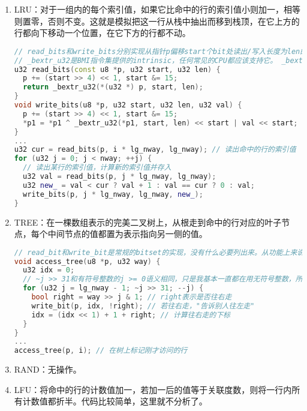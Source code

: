 \documentclass[12pt, UTF8]{article}
\begin{document}
\begin{enumerate}
  \item LRU：对于一组内的每个索引值，如果它比命中的行的索引值小则加一，相等则置零，否则不变。这就是模拟把这一行从栈中抽出而移到栈顶，在它上方的行都向下移动一个位置，在它下方的行都不动。
  
\begin{lstlisting}[language = C++, morekeywords = { u32 }, ndkeywords = { read_bits, write_bits }]
// read_bits和write_bits分别实现从指针p偏移start个bit处读出/写入长度为len的比特序列，这个实现要求len < 16
// _bextr_u32是BMI指令集提供的intrinsic，任何常见的CPU都应该支持它。 _bextr_u32(x, start, len)读出32位整数的比特区间[start, start + len)的值
u32 read_bits(const u8 *p, u32 start, u32 len) {
  p += (start >> 4) << 1, start &= 15;
  return _bextr_u32(*(u32 *) p, start, len);
}
void write_bits(u8 *p, u32 start, u32 len, u32 val) {
  p += (start >> 4) << 1, start &= 15;
  *p1 = *p1 ^ _bextr_u32(*p1, start, len) << start | val << start;
}
...
u32 cur = read_bits(p, i * lg_nway, lg_nway); // 读出命中的行的索引值
for (u32 j = 0; j < nway; ++j) {
  // 读出某行的索引值，计算新的索引值并存入
  u32 val = read_bits(p, j * lg_nway, lg_nway);           
  u32 new_ = val < cur ? val + 1 : val == cur ? 0 : val;
  write_bits(p, j * lg_nway, lg_nway, new_);
}
\end{lstlisting}

  \item TREE：在一棵数组表示的完美二叉树上，从根走到命中的行对应的叶子节点，每个中间节点的值都置为表示指向另一侧的值。

\begin{lstlisting}[language = C++, morekeywords = { u32 }, ndkeywords = { access_tree, read_bit, write_bit }]
// read_bit和write_bit是常规的bitset的实现，没有什么必要列出来。从功能上来说它们可以用read_bits和write_bits来实现，不过单独实现它们性能更好一些
void access_tree(u8 *p, u32 way) {
  u32 idx = 0;
  // ~j >> 31和有符号整数的j >= 0语义相同，只是我基本一直都在用无符号整数，所以就不想改成有符号整数了
  for (u32 j = lg_nway - 1; ~j >> 31; --j) {
    bool right = way >> j & 1; // right表示是否往右走
    write_bit(p, idx, !right); // 若往右走，"告诉别人往左走"
    idx = (idx << 1) + 1 + right; // 计算往右走的下标
  }
}
...
access_tree(p, i); // 在树上标记刚才访问的行
\end{lstlisting}
  \item RAND：无操作。
  \item LFU：将命中的行的计数值加一，若加一后的值等于关联度数，则将一行内所有计数值都折半。代码比较简单，这里就不分析了。
\end{enumerate}
\end{document}

